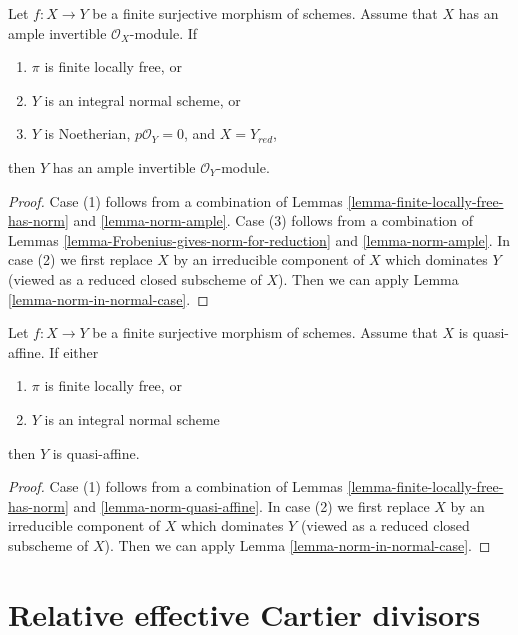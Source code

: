 \begin{proposition}
\label{proposition-push-down-ample}
Let $f : X \to Y$ be a finite surjective morphism of schemes.
Assume that $X$ has an ample invertible $\mathcal{O}_X$-module. If
\begin{enumerate}
\item $\pi$ is finite locally free, or
\item $Y$ is an integral normal scheme, or
\item $Y$ is Noetherian, $p\mathcal{O}_Y = 0$, and $X = Y_{red}$,
\end{enumerate}
then $Y$ has an ample invertible $\mathcal{O}_Y$-module.
\end{proposition}

\begin{proof}
Case (1) follows from a combination of
Lemmas \ref{lemma-finite-locally-free-has-norm} and \ref{lemma-norm-ample}.
Case (3) follows from a combination of
Lemmas \ref{lemma-Frobenius-gives-norm-for-reduction} and
\ref{lemma-norm-ample}.
In case (2) we first replace $X$ by an irreducible component of $X$
which dominates $Y$ (viewed as a reduced closed subscheme of $X$).
Then we can apply Lemma \ref{lemma-norm-in-normal-case}.
\end{proof}

\begin{lemma}
\label{lemma-push-down-quasi-affine}
Let $f : X \to Y$ be a finite surjective morphism of schemes.
Assume that $X$ is quasi-affine. If either
\begin{enumerate}
\item $\pi$ is finite locally free, or
\item $Y$ is an integral normal scheme
\end{enumerate}
then $Y$ is quasi-affine.
\end{lemma}

\begin{proof}
Case (1) follows from a combination of Lemmas
\ref{lemma-finite-locally-free-has-norm} and \ref{lemma-norm-quasi-affine}.
In case (2) we first replace $X$ by an irreducible component of $X$
which dominates $Y$ (viewed as a reduced closed subscheme of $X$).
Then we can apply Lemma \ref{lemma-norm-in-normal-case}.
\end{proof}





\section{Relative effective Cartier divisors}
\label{section-effective-Cartier-morphisms}

